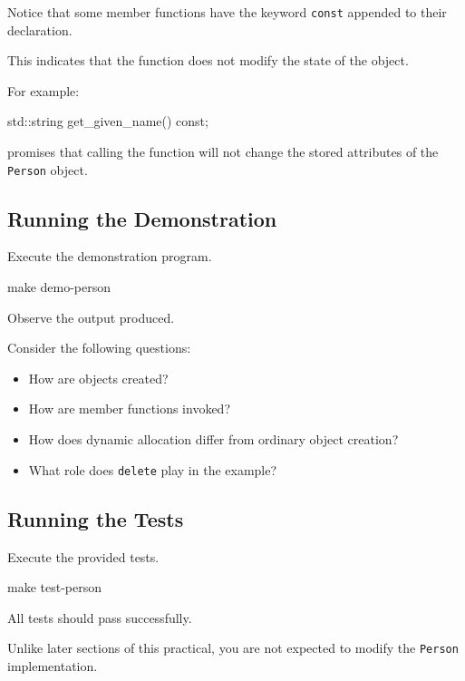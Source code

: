 \documentclass{csc2059practical}
\begin{document}
Notice that some member functions have the keyword
\texttt{const} appended to their declaration.

This indicates that the function does not modify the state of the
object.

For example:

\begin{cppcode}
std::string get_given_name() const;
\end{cppcode}

promises that calling the function will not change the stored
attributes of the \texttt{Person} object.

\subsection*{Running the Demonstration}

Execute the demonstration program.

\begin{terminal}
make demo-person
\end{terminal}

Observe the output produced.

Consider the following questions:

\begin{itemize}

\item How are objects created?

\item How are member functions invoked?

\item How does dynamic allocation differ from ordinary object creation?

\item What role does \texttt{delete} play in the example?

\end{itemize}

\subsection*{Running the Tests}

Execute the provided tests.

\begin{terminal}
make test-person
\end{terminal}

All tests should pass successfully.

Unlike later sections of this practical, you are not expected to
modify the \texttt{Person} implementation.
\end{document}
